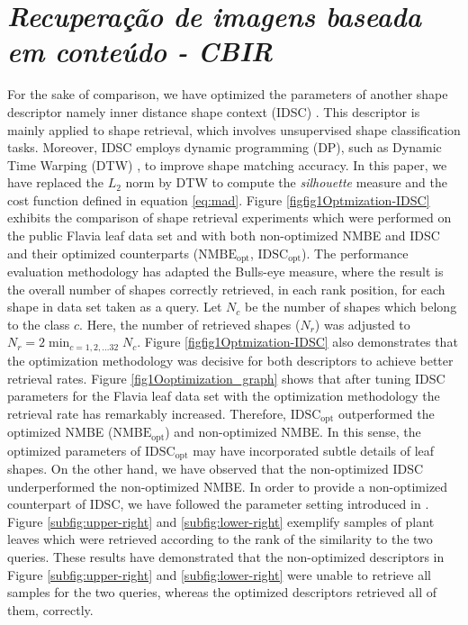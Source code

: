 {\section{\emph{Recuperação de imagens baseada em conteúdo - CBIR}}
For the sake of comparison, we have optimized the parameters of another shape descriptor namely inner distance shape context (IDSC) .
This descriptor is mainly applied to shape retrieval, which involves unsupervised shape classification tasks.  Moreover, IDSC employs dynamic programming (DP), such as Dynamic Time Warping (DTW) , to improve shape matching accuracy. In this paper, we have replaced the $L_2$ norm by DTW to compute the \emph{silhouette} measure and the cost function defined in equation \ref{eq:mad}.  
Figure \ref{figfig1Optmization-IDSC} exhibits the comparison of shape retrieval experiments which were performed on the public Flavia leaf data set and with both non-optimized NMBE and IDSC and their optimized counterparts ($\operatorname{NMBE_{opt}}$, $\operatorname{IDSC_{opt}}$).
The performance evaluation methodology has adapted the Bulls-eye measure, where the result is the overall number of shapes correctly  retrieved, in each rank position, for each shape in data set taken as a query.  Let $N_c$ be the number of shapes which belong to the class $c$. Here, the number of retrieved shapes ($N_r$) was adjusted to $N_r = 2\displaystyle \min_{c = 1,2,\dots 32}{N_c}$. Figure \ref{figfig1Optmization-IDSC} also demonstrates that the optimization methodology was decisive for both descriptors to achieve better retrieval rates. 
Figure \ref{fig1Ooptimization_graph}  shows that after tuning IDSC parameters for the Flavia leaf data set with the optimization methodology the retrieval rate has remarkably increased. Therefore, $\operatorname{IDSC_{opt}}$  outperformed the optimized NMBE ($\operatorname{NMBE_{opt}}$) and non-optimized NMBE. In this sense, the optimized parameters of $\operatorname{IDSC_{opt}}$ may have incorporated subtle details of leaf shapes. On the other hand, we have observed that the non-optimized IDSC underperformed the non-optimized NMBE. 
In order to provide a non-optimized counterpart of IDSC, we have followed the parameter setting introduced in .
Figure \ref{subfig:upper-right} and \ref{subfig:lower-right} exemplify samples of  plant leaves which were retrieved according to the rank of the similarity to the two queries. These results have demonstrated that the non-optimized descriptors in Figure \ref{subfig:upper-right} and \ref{subfig:lower-right} were unable to retrieve all samples for the two queries, whereas the  optimized descriptors retrieved all of them, correctly.

}
